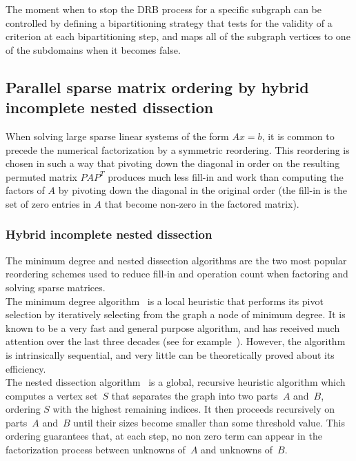 The moment when to stop the DRB process for a specific subgraph can be
controlled by defining a bipartitioning strategy that tests for the
validity of a criterion at each bipartitioning step, and maps all of
the subgraph vertices to one of the subdomains when it becomes false.

\subsection{Parallel sparse matrix ordering by hybrid incomplete nested dissection}

When solving large sparse linear systems of the form $Ax=b$, it is
common to precede the numerical factorization by a symmetric
reordering. This reordering is chosen in such a way that pivoting down
the diagonal in order on the resulting permuted matrix $PAP^T$
produces much less fill-in and work than computing the factors of $A$
by pivoting down the diagonal in the original order (the fill-in is
the set of zero entries in $A$ that become non-zero in the factored
matrix).

\subsubsection{Hybrid incomplete nested dissection}
\label{sec-algo-nested}

The minimum degree and nested dissection algorithms are the two most
popular reordering schemes used to reduce fill-in and operation count
when factoring and solving sparse matrices.
\\

The minimum degree algorithm~\cite{tiwa67} is a local heuristic that
performs its pivot selection by iteratively selecting from the graph a
node of minimum degree. It is known to be a very fast and general
purpose algorithm, and has received much attention over the last three
decades (see for example~\cite{amdadu96,geli89,liu-85}). However, the
algorithm is intrinsically sequential, and very little can be
theoretically proved about its efficiency.
\\

The nested dissection algorithm~\cite{geli81} is a global, recursive
heuristic algorithm which computes a vertex set~$S$ that separates the
graph into two parts~$A$ and~$B$, ordering $S$ with the highest
remaining indices. It then proceeds recursively on parts~$A$ and~$B$
until their sizes become smaller than some threshold value. This
ordering guarantees that, at each step, no non zero term can appear
in the factorization process between unknowns of~$A$ and unknowns
of~$B$.

